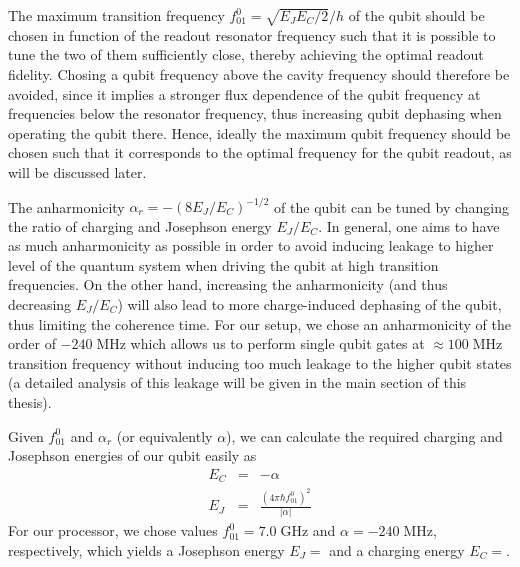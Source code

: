The maximum transition frequency $f_{01}^0 = \sqrt{E_J E_C/2}/h$  of the qubit should be chosen in function of the readout resonator frequency such that it is possible to tune the two of them sufficiently close, thereby achieving the optimal readout fidelity. Chosing a qubit frequency above the cavity frequency should therefore be avoided, since it implies a stronger flux dependence of the qubit frequency at frequencies below the resonator frequency, thus increasing qubit dephasing when operating the qubit there. Hence, ideally the maximum qubit frequency should be chosen such that it corresponds to the optimal frequency for the qubit readout, as will be discussed later.

\smallskip

The anharmonicity $\alpha_r=-(8E_J/E_C)^{-1/2}$ of the qubit can be tuned by changing the ratio of charging and Josephson energy $E_J/E_C$. In general, one aims to have as much anharmonicity as possible in order to avoid inducing leakage to higher level of the quantum system when driving the qubit at high transition frequencies. On the other hand, increasing the anharmonicity (and thus decreasing $E_J/E_C$) will also lead to more charge-induced dephasing of the qubit, thus limiting the coherence time. For our setup, we chose an anharmonicity of the order of $-240\;\mathrm{MHz}$ which allows us to perform single qubit gates at $\approx 100 \;\mathrm{MHz}$ transition frequency without inducing too much leakage to the higher qubit states (a detailed analysis of this leakage will be given in the main section of this thesis). 

\smallskip

Given $f_{01}^0$ and $\alpha_r$ (or equivalently $\alpha$), we can calculate the required charging and Josephson energies of our qubit easily as
%
\begin{eqnarray}
E_C & = & -\alpha \\
E_J & = & \frac{(4\pi\hbar f_{01}^0)^2}{|\alpha|}
\end{eqnarray}
%
For our processor, we chose values $f_{01}^0=7.0\;\mathrm{GHz}$ and $\alpha=-240\;\mathrm{MHz}$, respectively, which yields a Josephson energy $E_J=$ and a charging energy $E_C=$.

\smallskip

